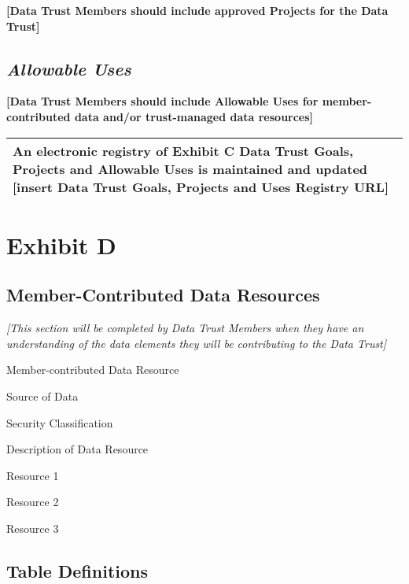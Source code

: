 \documentclass[]{book}
\begin{document}
\textbf{{[}Data Trust Members should include approved Projects for the Data Trust{]}}

\hypertarget{allowable-uses}{%
\section*{\texorpdfstring{\emph{Allowable Uses}}{Allowable Uses}}\label{allowable-uses}}

\textbf{{[}Data Trust Members should include Allowable Uses for member-contributed data and/or trust-managed data resources{]}}

\begin{longtable}[]{@{}l@{}}
\toprule
\endhead
An electronic registry of Exhibit C Data Trust Goals, Projects and Allowable Uses is maintained and updated {[}insert Data Trust Goals, Projects and Uses Registry URL{]}\tabularnewline
\bottomrule
\end{longtable}

\hypertarget{exhibit-d}{%
\chapter*{Exhibit D}\label{exhibit-d}}

\hypertarget{member-contributed-data-resources}{%
\section*{Member-Contributed Data Resources}\label{member-contributed-data-resources}}

\emph{{[}This section will be completed by Data Trust Members when they have an understanding of the data elements they will be contributing to the Data Trust{]}}

Member-contributed Data Resource

Source of Data

Security Classification

Description of Data Resource

Resource 1

Resource 2

Resource 3

\hypertarget{table-definitions}{%
\section*{Table Definitions}\label{table-definitions}}
\end{document}

